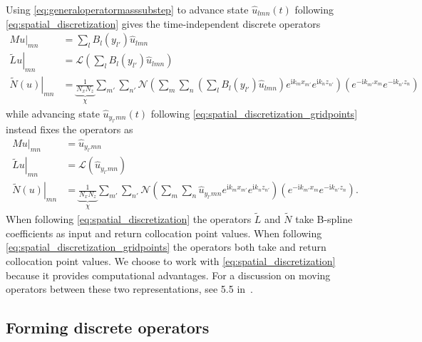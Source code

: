 \documentclass[letterpaper,11pt,nointlimits,reqno,draft]{amsart}
\newcommand{\ii}{\ensuremath{\mathrm{i}}}
\begin{document}
Using \eqref{eq:generaloperatormasssubstep} to advance state
$\hat{u}_{l m n}(t)$ following \eqref{eq:spatial_discretization} gives
the time-independent discrete operators
\begin{subequations}
\begin{align}
   M u\bigr|_{m n}
&= \sum_{l} B_l\!\left(y_{l'}\right)
   \hat{u}_{l m n}
\\
   \left.\tilde{L} u\right|_{m n}
&= \mathscr{L}\left(
     \sum_{l}
     B_l\!\left(y_{l'}\right)
     \hat{u}_{l m n}
   \right)
\\
   \left.\tilde{N}\!\left(u\right)\right|_{m n}
&= \underbrace{\frac{1}{N_x N_z}}_{\chi}
   \sum_{m'} \sum_{n'}
   \mathscr{N}\left(
     \sum_{m}
     \sum_{n}
     \left(
       \sum_{l} B_l\!\left(y_{l'}\right)
       \hat{u}_{l m n}
     \right)
     e^{\ii k_m x_{m'}}e^{\ii k_n z_{n'}}
   \right)
   \left(
     e^{-\ii k_{m'} x_m}e^{-\ii k_{n'} z_n}
   \right)
\end{align}
\end{subequations}
while advancing state $\hat{u}_{y_{l'} m n}(t)$ following
\eqref{eq:spatial_discretization_gridpoints} instead fixes the operators as
\begin{subequations}
\begin{align}
   M u\bigr|_{m n}
&= \hat{u}_{y_{l'} m n}
\\
   \left.\tilde{L} u\right|_{m n}
&= \mathscr{L}\left(\hat{u}_{y_{l'} m n}\right)
\\
   \left.\tilde{N}\!\left(u\right)\right|_{m n}
&= \underbrace{\frac{1}{N_x N_z}}_{\chi}
   \sum_{m'} \sum_{n'}
   \mathscr{N}\left(
     \sum_{m}
     \sum_{n}
     \hat{u}_{y_{l'} m n}
     e^{\ii k_m x_{m'}}e^{\ii k_n z_{n'}}
   \right)
   \left(
     e^{-\ii k_{m'} x_m}e^{-\ii k_{n'} z_n}
   \right)
   .
\end{align}
\end{subequations}
When following \eqref{eq:spatial_discretization} the operators $\tilde{L}$ and
$\tilde{N}$ take B-spline coefficients as input and return collocation point
values.  When following \eqref{eq:spatial_discretization_gridpoints} the
operators both take and return collocation point values.  We choose to work
with \eqref{eq:spatial_discretization} because it provides computational
advantages.  For a discussion on moving operators between these two
representations, see \textsection{}5.5 in~\cite{Boyd2001}.

\subsection{Forming discrete operators}
\label{sec:formingoperators}
\end{document}
